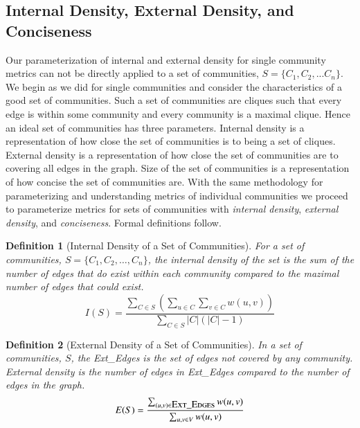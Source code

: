 \documentclass[phd,tocprelim]{cornell}
\newtheorem{definition}{Definition}
\begin{document}
\subsection{Internal Density, External Density, and Conciseness}

Our parameterization of internal and external density for single community metrics can not be directly applied to a set of communities, $S = \{C_1,C_2,...C_n\}$. We begin as we did for single communities and consider the characteristics of a good set of communities.  Such a set of communities are cliques such that every edge is within some community and every community is a maximal clique. Hence an ideal set of communities has three parameters. Internal density is a representation of how close the set of communities is to being a set of cliques. External density is a representation of how close the set of communities are to covering all edges in the graph. Size of the set of communities is a representation of how concise the set of communities are. With the same methodology for parameterizing and understanding metrics of individual communities we proceed to parameterize metrics for sets of communities with {\it internal density}, {\it external density}, and {\it conciseness}.  Formal definitions follow.

\begin{definition}[Internal Density of a Set of Communities] For a set of communities, $S = \{C_1, C_2, \dots, C_n\}$, the internal density of the set is the sum of the number of edges that do exist within each community compared to the mazimal number of edges that could exist.
\begin{equation}
I(S) = \frac{\sum_{C \in S} \left( \sum_{u \in C} \sum_{v \in C} w(u,v)\right)}{\sum_{C \in S}|C|(|C| - 1)}
\end{equation}
\label{def_int_set}
\end{definition}

\begin{definition}[External Density of a Set of Communities] In a set of communities, $S$, the {\sc Ext\_Edges} is the set of edges not covered by any community.  External density is the number of edges in {\sc Ext\_Edges} compared to the number of edges in the graph.
\begin{equation}
E(S) = \frac{\sum_{(u, v) \in \mbox{\sc Ext\_Edges}} w(u,v)} {\sum_{u,v \in V}w(u,v)}
\end{equation}
\label{def_ext_set}
\end{definition}
\end{document}
